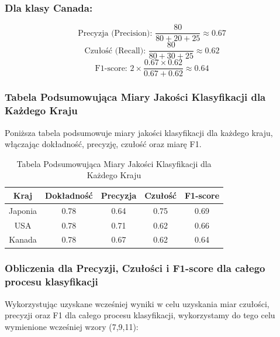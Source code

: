 \documentclass{article}
\begin{document}
\subsubsection*{Dla klasy Canada:}

\begin{equation}
    \text{Precyzja (Precision): } \frac{80}{80 + 20 + 25} \approx 0.67
\end{equation}
\begin{equation}
    \text{Czułość (Recall): } \frac{80}{80 + 30 + 25} \approx 0.62
\end{equation}
\begin{equation}
    \text{F1-score: } 2 \times \frac{0.67 \times 0.62}{0.67 + 0.62} \approx 0.64
\end{equation}


\subsubsection*{Tabela Podsumowująca Miary Jakości Klasyfikacji dla Każdego Kraju}

Poniższa tabela podsumowuje miary jakości klasyfikacji dla każdego kraju, włączając dokładność, precyzję, czułość oraz miarę F1.


\begin{table}[htbp]
\centering
\caption{Tabela Podsumowująca Miary Jakości Klasyfikacji dla Każdego Kraju \newline}
\label{tab:summary_metrics}
\begin{tabular}{|c|c|c|c|c|}
\hline
Kraj    & Dokładność & Precyzja & Czułość & F1-score \\ \hline
Japonia & 0.78       & 0.64     & 0.75    & 0.69     \\ \hline
USA     & 0.78       & 0.71     & 0.62    & 0.66     \\ \hline
Kanada  & 0.78       & 0.67     & 0.62    & 0.64     \\ \hline
\end{tabular}
\end{table}

\subsubsection*{Obliczenia dla Precyzji, Czułości i F1-score dla całego procesu klasyfikacji}

Wykorzystując uzyskane wcześniej wyniki w celu uzyskania miar czułości, precyzji oraz F1 dla całego procesu klasyfikacji, wykorzystamy do tego celu wymienione wcześniej wzory (7,9,11):
\end{document}
